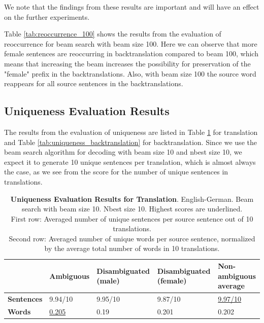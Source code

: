 We note that the findings from these results are important and will have an effect on the further experiments.

Table \ref{tab:reoccurrence_100} shows the results from the evaluation of reoccurrence for beam search with beam size 100. Here we can observe that more female sentences are reoccurring in backtranslation compared to beam 100, which means that increasing the beam increases the possibility for preservation of the "female" prefix in the backtranslations.
Also, with beam size 100 the source word reappears for all source sentences in the backtranslations.

\subsection{Uniqueness Evaluation Results}
\label{ch:Base_Experiment:Results:Uniqueness}

The results from the evaluation of uniqueness are listed in Table \ref{tab:uniqueness_translation} for translation and Table \ref{tab:uniqueness_backtranslation} for backtranslation.
Since we use the beam search algorithm for decoding with beam size 10 and nbest size 10, we expect it to generate 10 unique sentences per translation, which is almost always the case, as we see from the score for the number of unique sentences in translations. 

\begin{table}[!htb]
    \begin{tabularx}{\linewidth}{|X|XXXX|}
        \hline
         & \textbf{Ambiguous} & \textbf{Disambiguated (male)} & \textbf{Disambiguated (female)} & \textbf{Non-ambiguous average} \\ \hline
         \textbf{Sentences} & 9.94/10 & 9.95/10 & 9.87/10 & \underline{9.97/10} \\ 
         \textbf{Words} & \underline{0.205} & 0.19 & 0.201 & 0.202 \\ \hline
    \end{tabularx}
    \caption{\textbf{Uniqueness Evaluation Results for Translation}. English-German. Beam search with beam size 10. Nbest size 10. Highest scores are underlined. \\ First row: Averaged number of unique sentences per source sentence out of 10 translations. \\ Second row: Averaged number of unique words per source sentence, normalized by the average total number of words in 10 translations.}
    \label{tab:uniqueness_translation}
\end{table}

